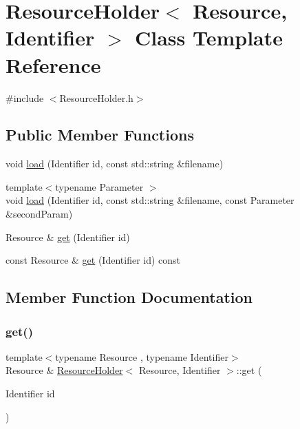 \hypertarget{class_resource_holder}{}\section{Resource\+Holder$<$ Resource, Identifier $>$ Class Template Reference}
\label{class_resource_holder}


{\ttfamily \#include $<$Resource\+Holder.\+h$>$}

\subsection*{Public Member Functions}
\begin{DoxyCompactItemize}
\item 
void \hyperlink{class_resource_holder_accb6a2b6bd2da503ddfd57b5c0028a16}{load} (Identifier id, const std\+::string \&filename)
\item 
{\footnotesize template$<$typename Parameter $>$ }\\void \hyperlink{class_resource_holder_ae83a7a88b2b2a74b6143796eb4452110}{load} (Identifier id, const std\+::string \&filename, const Parameter \&second\+Param)
\item 
Resource \& \hyperlink{class_resource_holder_a6452638a75b6df7ea7d610f204632850}{get} (Identifier id)
\item 
const Resource \& \hyperlink{class_resource_holder_aaf453199dbdfb9b8395c52b29eb915c2}{get} (Identifier id) const
\end{DoxyCompactItemize}


\subsection{Member Function Documentation}
\mbox{\label{class_resource_holder_a6452638a75b6df7ea7d610f204632850}} 
\subsubsection{\texorpdfstring{get()}{get()}\hspace{0.1cm}{\footnotesize\ttfamily [1/2]}}
{\footnotesize\ttfamily template$<$typename Resource , typename Identifier$>$ \\
Resource \& \hyperlink{class_resource_holder}{Resource\+Holder}$<$ Resource, Identifier $>$\+::get (\begin{DoxyParamCaption}\item[{Identifier}]{id }\end{DoxyParamCaption})}


